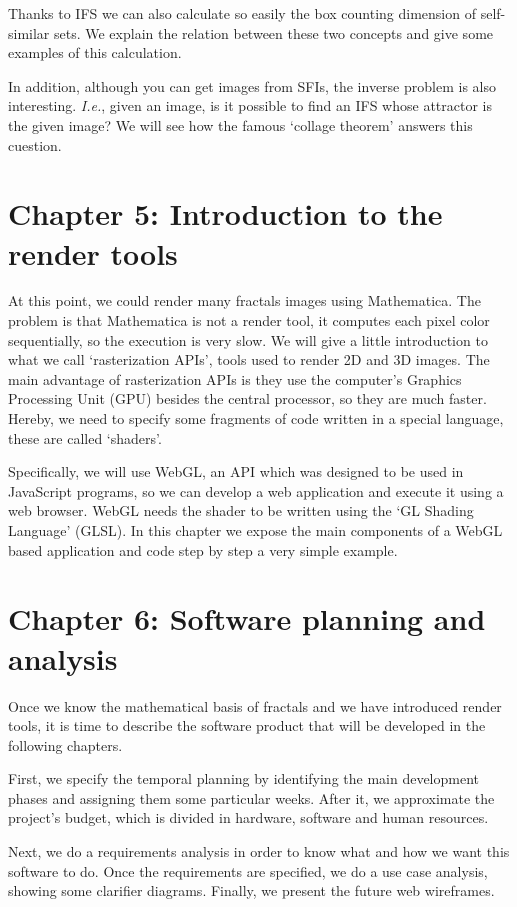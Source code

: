 Thanks to IFS we can also calculate so easily the box counting dimension of self-similar sets. We explain the relation between these two concepts and give some examples of this calculation.

In addition, although you can get images from SFIs, the inverse problem is also interesting. \textit{I.e.}, given an image, is it possible to find an IFS whose attractor is the given image? We will see how the famous `collage theorem' answers this cuestion.

\section*{Chapter 5: Introduction to the render tools}

At this point, we could render many fractals images using Mathematica. The problem is that Mathematica is not a render tool, it computes each pixel color sequentially, so the execution is very slow. We will give a little introduction to what we call `rasterization APIs', tools used to render 2D and 3D images. The main advantage of rasterization APIs is they use the computer's Graphics Processing Unit (GPU) besides the central processor, so they are much faster. Hereby, we need to specify some fragments of code written in a special language, these are called `shaders'. 

Specifically, we will use WebGL, an API which was designed to be used in JavaScript programs, so we can develop a web application and execute it using a web browser. WebGL needs the shader to be written using the `GL Shading Language' (GLSL). In this chapter we expose the main components of a WebGL based application and code step by step a very simple example.

\section*{Chapter 6: Software planning and analysis}

Once we know the mathematical basis of fractals and we have introduced render tools, it is time to describe the software product that will be developed in the following chapters. 

First, we specify the temporal planning by identifying the main development phases and assigning them some particular weeks. After it, we approximate the project's budget, which is divided in hardware, software and human resources.

Next, we do a requirements analysis in order to know what and how we want this software to do. Once the requirements are specified, we do a use case analysis, showing some clarifier diagrams. Finally, we present the future web wireframes.


